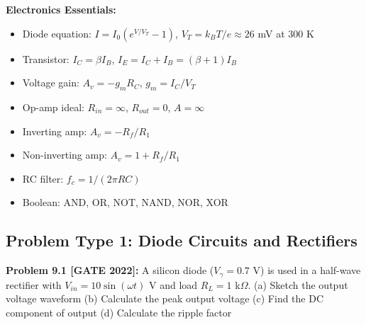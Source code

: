 \documentclass[12pt,a4paper]{article}
\begin{document}
\begin{theorem}
\textbf{Electronics Essentials:}
\begin{itemize}
    \item Diode equation: $I = I_0(e^{V/V_T} - 1)$, $V_T = k_BT/e \approx 26$ mV at 300 K
    \item Transistor: $I_C = \beta I_B$, $I_E = I_C + I_B = (\beta + 1)I_B$
    \item Voltage gain: $A_v = -g_m R_C$, $g_m = I_C/V_T$
    \item Op-amp ideal: $R_{in} = \infty$, $R_{out} = 0$, $A = \infty$
    \item Inverting amp: $A_v = -R_f/R_1$
    \item Non-inverting amp: $A_v = 1 + R_f/R_1$
    \item RC filter: $f_c = 1/(2\pi RC)$
    \item Boolean: AND, OR, NOT, NAND, NOR, XOR
\end{itemize}
\end{theorem}

\subsection{Problem Type 1: Diode Circuits and Rectifiers}

\textbf{Problem 9.1 [GATE 2022]:} A silicon diode ($V_{\gamma} = 0.7$ V) is used in a half-wave rectifier with $V_{in} = 10\sin(\omega t)$ V and load $R_L = 1$ k$\Omega$.
(a) Sketch the output voltage waveform
(b) Calculate the peak output voltage
(c) Find the DC component of output
(d) Calculate the ripple factor
\end{document}

